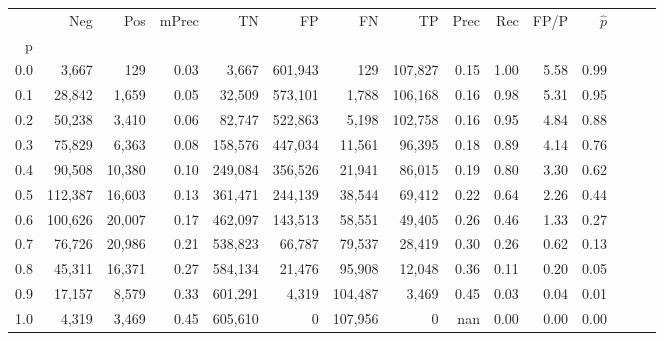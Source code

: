 \begin{tabular}{rrrrrrrrrrrrrrr}
\toprule
{} &      Neg &     Pos & mPrec &       TN &       FP &       FN &       TP &  Prec &   Rec &  FP/P & $\hat{p}$ \\
p   &          &         &       &          &          &          &          &       &       &       &           \\
\midrule
0.0 &    3,667 &     129 &  0.03 &    3,667 &  601,943 &      129 &  107,827 &  0.15 &  1.00 &  5.58 &      0.99 \\
0.1 &   28,842 &   1,659 &  0.05 &   32,509 &  573,101 &    1,788 &  106,168 &  0.16 &  0.98 &  5.31 &      0.95 \\
0.2 &   50,238 &   3,410 &  0.06 &   82,747 &  522,863 &    5,198 &  102,758 &  0.16 &  0.95 &  4.84 &      0.88 \\
0.3 &   75,829 &   6,363 &  0.08 &  158,576 &  447,034 &   11,561 &   96,395 &  0.18 &  0.89 &  4.14 &      0.76 \\
0.4 &   90,508 &  10,380 &  0.10 &  249,084 &  356,526 &   21,941 &   86,015 &  0.19 &  0.80 &  3.30 &      0.62 \\
0.5 &  112,387 &  16,603 &  0.13 &  361,471 &  244,139 &   38,544 &   69,412 &  0.22 &  0.64 &  2.26 &      0.44 \\
0.6 &  100,626 &  20,007 &  0.17 &  462,097 &  143,513 &   58,551 &   49,405 &  0.26 &  0.46 &  1.33 &      0.27 \\
0.7 &   76,726 &  20,986 &  0.21 &  538,823 &   66,787 &   79,537 &   28,419 &  0.30 &  0.26 &  0.62 &      0.13 \\
0.8 &   45,311 &  16,371 &  0.27 &  584,134 &   21,476 &   95,908 &   12,048 &  0.36 &  0.11 &  0.20 &      0.05 \\
0.9 &   17,157 &   8,579 &  0.33 &  601,291 &    4,319 &  104,487 &    3,469 &  0.45 &  0.03 &  0.04 &      0.01 \\
1.0 &    4,319 &   3,469 &  0.45 &  605,610 &        0 &  107,956 &        0 &   nan &  0.00 &  0.00 &      0.00 \\
\bottomrule
\end{tabular}

